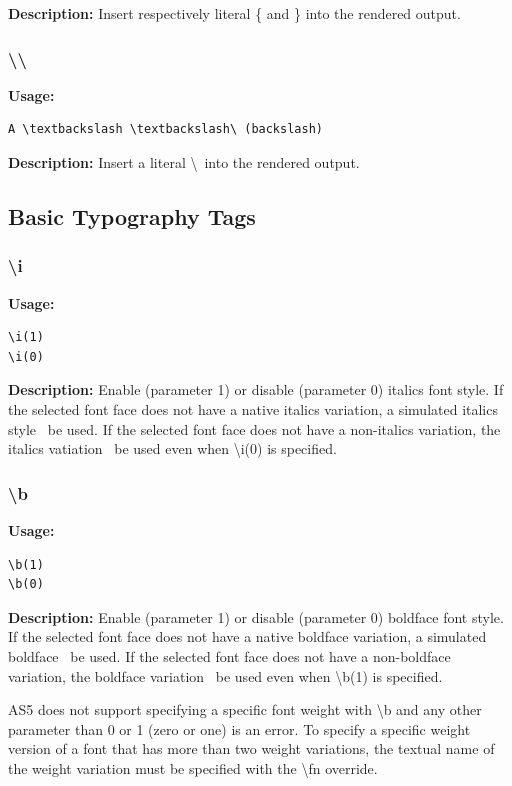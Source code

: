 \documentclass{spec}
\begin{document}
\textbf{Description:}
Insert respectively literal \{ and \} into the rendered output.

\subsubsection{\textbackslash \textbackslash}
\textbf{Usage:}
\begin{verbatim}
A \textbackslash \textbackslash\ (backslash)
\end{verbatim}

\textbf{Description:}
Insert a literal \textbackslash\ into the rendered output.


\subsection{Basic Typography Tags}

\subsubsection{\textbackslash i}
\textbf{Usage:}
\begin{verbatim}
\i(1)
\i(0)
\end{verbatim}

\textbf{Description:}
Enable (parameter 1) or disable (parameter 0) italics font style. If the selected font face does not
have a native italics variation, a simulated italics style \must\ be used. If the selected font face
does not have a non-italics variation, the italics vatiation \must\ be used even when \textbackslash i(0)
is specified.

\subsubsection{\textbackslash b}
\textbf{Usage:}
\begin{verbatim}
\b(1)
\b(0)
\end{verbatim}

\textbf{Description:}
Enable (parameter 1) or disable (parameter 0) boldface font style. If the selected font face does not
have a native boldface variation, a simulated boldface \must\ be used. If the selected font face
does not have a non-boldface variation, the boldface variation \must\ be used even when \textbackslash b(1)
is specified.

AS5 does not support specifying a specific font weight with \textbackslash b and any other parameter
than 0 or 1 (zero or one) is an error. To specify a specific weight version of a font that has more
than two weight variations, the textual name of the weight variation must be specified with the
\textbackslash fn override.
\end{document}
